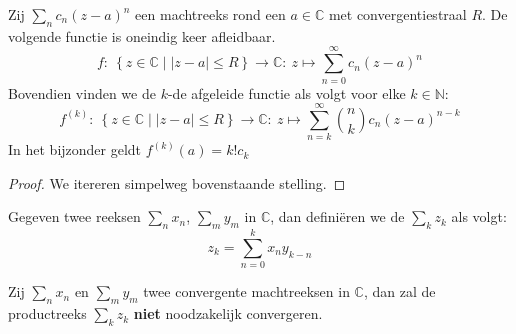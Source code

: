 \documentclass[main.tex]{subfiles}
\begin{document}
\begin{bgev}
  Zij $\sum_{n}c_{n}(z-a)^{n}$ een machtreeks rond een $a\in \mathbb{C}$ met convergentiestraal $R$.
  De volgende functie is oneindig keer afleidbaar.
  \[ f:\ \left\{ z \in \mathbb{C} \mid |z-a| \le R \right\} \rightarrow \mathbb{C}:\ z \mapsto \sum_{n=0}^{\infty}c_{n}(z-a)^{n}  \]
  Bovendien vinden we de $k$-de afgeleide functie als volgt voor elke $k\in \mathbb{N}$:
  \[ f^{(k)}:\ \left\{ z \in \mathbb{C} \mid |z-a| \le R \right\} \rightarrow \mathbb{C}:\ z \mapsto \sum_{n=k}^{\infty}\binom{n}{k}c_{n}(z-a)^{n-k}  \]
  In het bijzonder geldt $f^{(k)}(a) = k!c_{k}$

  \begin{proof}
    We itereren simpelweg bovenstaande stelling.
  \end{proof}
\end{bgev}

\begin{de}
  Gegeven twee reeksen $\sum_{n}x_{n}$, $\sum_{m}y_{m}$ in $\mathbb{C}$, dan defini\"eren we de  $\sum_{k}z_{k}$ als volgt:
  \[ z_{k} = \sum_{n=0}^{k}x_{n}y_{k-n} \]
\end{de}

\begin{gst}
  Zij $\sum_{n}x_{n}$ en $\sum_{m}y_{m}$ twee convergente machtreeksen in $\mathbb{C}$, dan zal de productreeks $\sum_{k}z_{k}$ \textbf{niet} noodzakelijk convergeren.
\end{gst}
\end{document}
